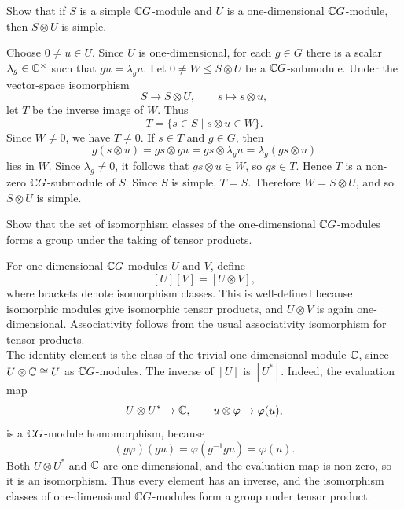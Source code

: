 \documentclass[../Odyssey_Project.tex]{subfiles}
\begin{document}
\begin{exercise}
\label{ex:14.3}
Show that if $S$ is a simple $\mathbb{C} G$-module and $U$ is a one-dimensional $\mathbb{C} G$-module, then $S \otimes U$ is simple.
\end{exercise}
\begin{solution}
    Choose $0\neq u\in U$. Since $U$ is one-dimensional, for each $g\in G$ there is a scalar $\lambda_g\in \mathbb{C}^{\times}$ such that $gu=\lambda_g u$. Let $0\neq W\leq S\otimes U$ be a $\mathbb{C} G$-submodule. Under the vector-space isomorphism
    \[
        S\to S\otimes U,\qquad s\mapsto s\otimes u,
    \]
    let $T$ be the inverse image of $W$. Thus
    \[
        T=\{s\in S\mid s\otimes u\in W\}.
    \]
    Since $W\neq0$, we have $T\neq0$. If $s\in T$ and $g\in G$, then
    \[
        g(s\otimes u)=gs\otimes gu=gs\otimes \lambda_g u=\lambda_g(gs\otimes u)
    \]
    lies in $W$. Since $\lambda_g\neq0$, it follows that $gs\otimes u\in W$, so $gs\in T$. Hence $T$ is a non-zero $\mathbb{C} G$-submodule of $S$. Since $S$ is simple, $T=S$. Therefore $W=S\otimes U$, and so $S\otimes U$ is simple.
\end{solution}

\begin{exercise}
\label{ex:14.4}
Show that the set of isomorphism classes of the one-dimensional $\mathbb{C} G$-modules forms a group under the taking of tensor products.
\end{exercise}
\begin{solution}
    For one-dimensional $\mathbb{C} G$-modules $U$ and $V$, define
    \[
        [U][V]=[U\otimes V],
    \]
    where brackets denote isomorphism classes. This is well-defined because isomorphic modules give isomorphic tensor products, and $U\otimes V$ is again one-dimensional. Associativity follows from the usual associativity isomorphism for tensor products.\\
    The identity element is the class of the trivial one-dimensional module $\mathbb{C}$, since $U\otimes \mathbb{C}\cong U$ as $\mathbb{C} G$-modules. The inverse of $[U]$ is $[U^*]$. Indeed, the evaluation map
    \[
        U\otimes U^*\to \mathbb{C},\qquad u\otimes \varphi\mapsto \varphi(u),
    \]
    is a $\mathbb{C} G$-module homomorphism, because
    \[
        (g\varphi)(gu)=\varphi(g^{-1}gu)=\varphi(u).
    \]
    Both $U\otimes U^*$ and $\mathbb{C}$ are one-dimensional, and the evaluation map is non-zero, so it is an isomorphism. Thus every element has an inverse, and the isomorphism classes of one-dimensional $\mathbb{C} G$-modules form a group under tensor product.
\end{solution}
\end{document}
